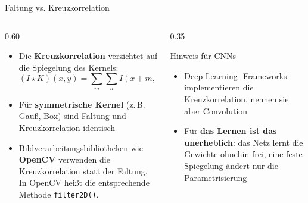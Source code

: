 {%
\begin{frame}{Faltung vs. Kreuzkorrelation}
  \small
\begin{columns}
\begin{column}{0.60\textwidth}
\begin{itemize}
    \item Die \textbf{Kreuzkorrelation} verzichtet auf die Spiegelung des Kernels:
    \[
        (I \star K)(x, y) = \sum_{m} \sum_{n} I(x + m,\, y + n)\, K(m, n)
    \]
    \item Für \textbf{symmetrische Kernel} (z.\,B. Gauß, Box) sind Faltung und Kreuzkorrelation identisch
    \item Bildverarbeitungsbibliotheken wie \textbf{OpenCV} verwenden die Kreuzkorrelation statt der Faltung. In OpenCV heißt die entsprechende Methode \texttt{filter2D()}.
\end{itemize}
\end{column}
\begin{column}{0.35\textwidth}
    \begin{block}{Hinweis für CNNs}
\begin{itemize}
    \item Deep-Learning- Frameworks implementieren die Kreuzkorrelation, nennen sie aber Convolution
    \item Für \textbf{das Lernen ist das unerheblich}: das Netz lernt die Gewichte ohnehin frei, eine feste Spiegelung ändert nur die Parametrisierung
\end{itemize}
\end{block}
\end{column}
\end{columns}
\end{frame}

}
